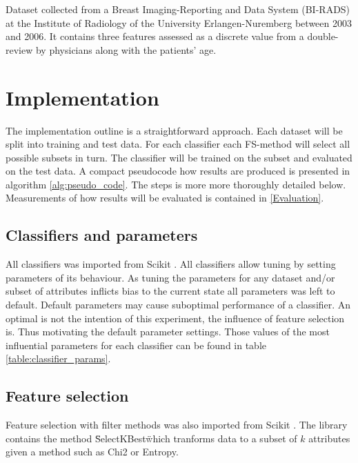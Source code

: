 Dataset collected from a Breast Imaging-Reporting and Data System (BI-RADS) at the Institute of Radiology of the University Erlangen-Nuremberg between 2003 and 2006. It contains three features assessed as a discrete value from a double-review by physicians along with the patients' age.




\section{Implementation}

The implementation outline is a straightforward approach. Each dataset will be split into training and test data. For each classifier each FS-method will select all possible subsets in turn. The classifier will be trained on the subset and evaluated on the test data. A compact pseudocode how results are produced is presented in algorithm \ref{alg:pseudo_code}. The steps is more more thoroughly detailed below. Measurements of how results will be evaluated is contained in \ref{Evaluation}.



\subsection{Classifiers and parameters}
All classifiers was imported from Scikit \parencite{scikit-learn}. All classifiers allow tuning by setting parameters of its behaviour. As tuning the parameters for any dataset and/or subset of attributes inflicts bias to the current state all parameters was left to default. Default parameters may cause suboptimal performance of a classifier. An optimal is not the intention of this experiment, the influence of feature selection is. Thus motivating the default parameter settings. Those values of the most influential parameters for each classifier can be found in table \ref{table:classifier_params}.



\subsection{Feature selection}

Feature selection with filter methods was also imported from  Scikit \parencite{scikit-learn}. The library contains the method \"SelectKBest\" which tranforms data to a subset of $k$ attributes given a method such as Chi2 or Entropy.


